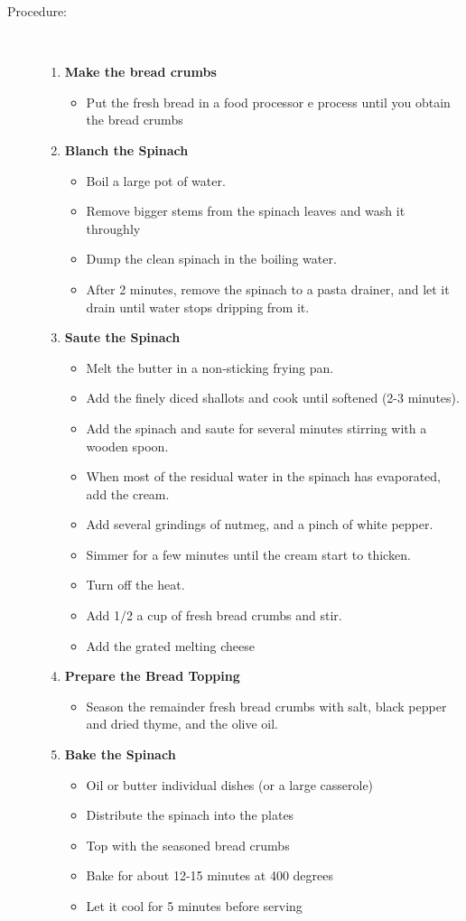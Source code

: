\documentclass[11pt,letterpaper]{article}
\begin{document}
\begin{description}
\item[Procedure:]\ \\
	\begin{enumerate}
	\item {\bf Make the bread crumbs}
	\begin{itemize}
	\item Put the fresh bread in a food processor e process until you obtain the bread crumbs
	\end{itemize}
	\item {\bf Blanch the Spinach}
	\begin{itemize}
	\item Boil a large pot of water.
        \item Remove bigger stems from the spinach leaves and wash it throughly
	\item Dump the clean spinach in the boiling water.
	\item After 2 minutes, remove the spinach to a pasta drainer, and let it drain until water stops dripping from it.
	\end{itemize}
	\item {\bf Saute the Spinach}
	\begin{itemize}
	\item Melt the butter in a non-sticking frying pan.
	\item Add the finely diced shallots and cook until softened (2-3 minutes).
	\item Add the spinach and saute for several minutes stirring with a wooden spoon.
	\item When most of the residual water in the spinach has evaporated, add the cream.
	\item Add several grindings of nutmeg, and a pinch of white pepper.
	\item Simmer for a few minutes until the cream start to thicken.
	\item Turn off the heat.
	\item Add 1/2 a cup of fresh bread crumbs and stir.
	\item Add the grated melting cheese
	\end{itemize}
	\item {\bf Prepare the Bread Topping}
	\begin{itemize}
	\item Season the remainder fresh bread crumbs with salt, black pepper and dried thyme, and the olive oil.
	\end{itemize}
	\item {\bf Bake the Spinach}
	\begin{itemize}
	\item Oil or butter individual dishes (or a large casserole)
	\item Distribute the spinach into the plates
	\item Top with the seasoned bread crumbs
	\item Bake for about 12-15 minutes at 400 degrees
	\item Let it cool for 5 minutes before serving
	\end{itemize}
	\end{enumerate}
\end{description}
\end{document}
